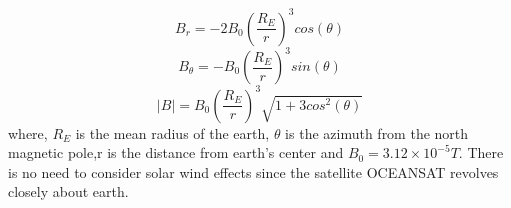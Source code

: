 \documentclass[10pt,a4paper]{report}
\begin{document}
\begin{equation}
B_{r}=-2B_{0}\left(\frac{R_{E}}{r}\right)^{3}cos(\theta)
\end{equation}
\begin{equation}
B_{\theta}=-B_{0}\left(\frac{R_{E}}{r}\right)^{3}sin(\theta)
\end{equation}
\begin{equation}
|B|=B_{0}\left(\frac{R_{E}}{r}\right)^{3}\sqrt{1+3cos^{2}(\theta)}
\end{equation}
where, $ R_{E} $ is the mean radius of the earth, $ \theta $ is the azimuth from the north magnetic pole,r is the distance from earth's center and $B_{0}=3.12\times10^{-5}T$. There is no need to consider solar wind effects since the satellite OCEANSAT revolves closely about earth.
\end{document}

